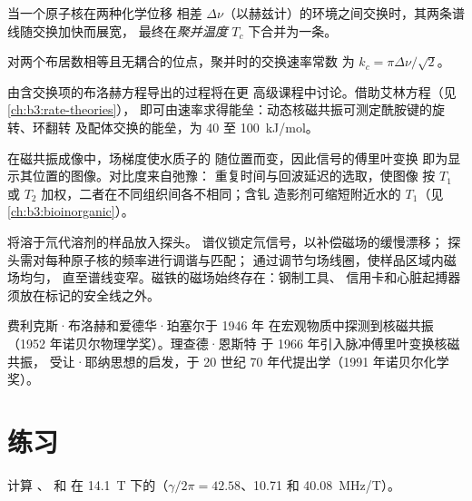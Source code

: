 \begin{definition}[聚并温度]\label{def:b3:advanced-nmr:coalescence}
当一个原子核在两种化学位移
相差 $\Delta\nu$（以赫兹计）的环境之间交换时，其两条谱线随交换加快而展宽，
最终在\emph{聚并温度}
$T_c$ 下合并为一条。
\end{definition}

\begin{proposition}[聚并时的速率]\label{prop:b3:advanced-nmr:coalescence}
对两个布居数相等且无耦合的位点，聚并时的交换速率常数
为 $k_c = \pi\Delta\nu/\sqrt2$。
\end{proposition}
\admitted

由含交换项的布洛赫方程导出的过程将在更
高级课程中讨论。借助艾林方程（见\cref{ch:b3:rate-theories}），
即可由速率求得能垒：动态核磁共振可测定酰胺键的旋转、环翻转
及配体交换的能垒，为 40 至 \qty{100}{kJ/mol}。

\begin{example}[一幅 MRI 图像]\label{ex:b3:advanced-nmr:mri}
在磁共振成像中，场梯度使水质子的
随位置而变，因此信号的傅里叶变换
即为显示其位置的图像。对比度来自弛豫：
重复时间与回波延迟的选取，使图像
按 $T_1$ 或 $T_2$ 加权，二者在不同组织间各不相同；含钆
造影剂可缩短附近水的 $T_1$（见\cref{ch:b3:bioinorganic}）。
\end{example}

\begin{inthelab}[准备谱仪]
将溶于氘代溶剂的样品放入探头。
谱仪锁定氘信号，以补偿磁场的缓慢漂移；
探头需对每种原子核的频率进行调谐与匹配；
通过调节匀场线圈，使样品区域内磁场均匀，
直至谱线变窄。磁铁的磁场始终存在：钢制工具、
信用卡和心脏起搏器须放在标记的安全线之外。
\end{inthelab}

\begin{history}[从共振到二维谱]
费利克斯·布洛赫和爱德华·珀塞尔于 1946 年
在宏观物质中探测到核磁共振（1952 年诺贝尔物理学奖）。理查德·恩斯特
于 1966 年引入脉冲傅里叶变换核磁共振，
受让·耶纳思想的启发，于 20 世纪 70 年代提出学（1991 年诺贝尔化学奖）。
\end{history}

\section{练习}

\begin{exercise}[$\star$]\label{exo:b3:advanced-nmr:1}
计算 、 和  在 \qty{14.1}{T}
下的（$\gamma/2\pi = 42.58$、10.71 和 \qty{40.08}{MHz/T}）。
\end{exercise}

